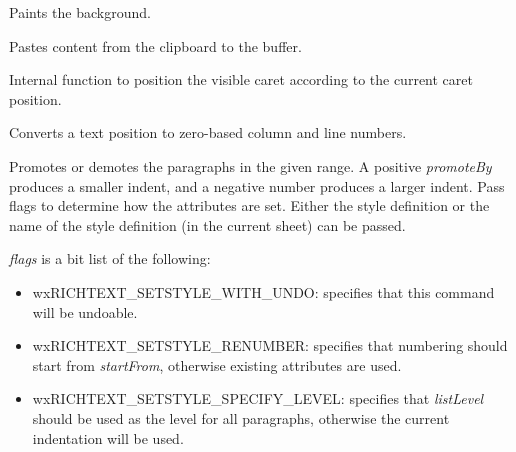
Paints the background.

\label{wxrichtextctrlpaste}


Pastes content from the clipboard to the buffer.

\label{wxrichtextctrlpositioncaret}


Internal function to position the visible caret according to the current caret position.

\label{wxrichtextctrlpositiontoxy}


Converts a text position to zero-based column and line numbers.

\label{wxrichtextctrlpromotelist}



Promotes or demotes the paragraphs in the given range. A positive {\it promoteBy} produces a smaller indent, and a negative number
produces a larger indent. Pass flags to determine how the attributes are set.
Either the style definition or the name of the style definition (in the current sheet) can be passed.

{\it flags} is a bit list of the following:

\begin{itemize}\itemsep=0pt
\item wxRICHTEXT\_SETSTYLE\_WITH\_UNDO: specifies that this command will be undoable.
\item wxRICHTEXT\_SETSTYLE\_RENUMBER: specifies that numbering should start from {\it startFrom}, otherwise existing attributes are used.
\item wxRICHTEXT\_SETSTYLE\_SPECIFY\_LEVEL: specifies that {\it listLevel} should be used as the level for all paragraphs, otherwise the current indentation will be used.
\end{itemize}

